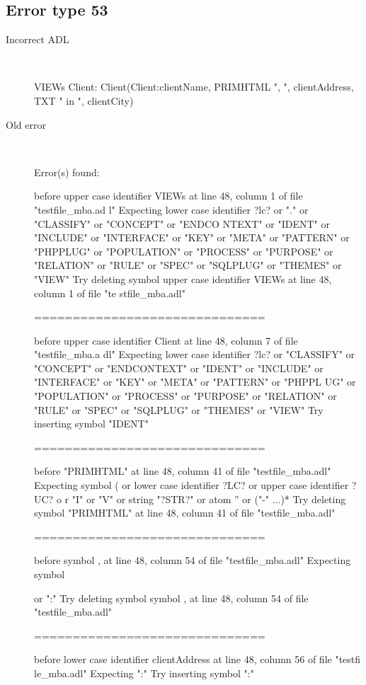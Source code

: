 \subsection{Error type 53}
  \begin{description}
  \item[Incorrect ADL]~\\
\begin{adl}
VIEWs Client: Client(Client:clientName, PRIMHTML ", ", clientAddress, TXT " in ", clientCity)\end{adl}
  \item[Old error]~\\
\begin{haskell}
Error(s) found:

before upper case identifier VIEWs at line 48, column 1 of file "testfile_mba.ad
l"
Expecting lower case identifier ?lc? or "." or "CLASSIFY" or "CONCEPT" or "ENDCO
NTEXT" or "IDENT" or "INCLUDE" or "INTERFACE" or "KEY" or "META" or "PATTERN" or
 "PHPPLUG" or "POPULATION" or "PROCESS" or "PURPOSE" or "RELATION" or "RULE" or
"SPEC" or "SQLPLUG" or "THEMES" or "VIEW"
Try deleting symbol upper case identifier VIEWs at line 48, column 1 of file "te
stfile_mba.adl"

==============================

before upper case identifier Client at line 48, column 7 of file "testfile_mba.a
dl"
Expecting lower case identifier ?lc? or "CLASSIFY" or "CONCEPT" or "ENDCONTEXT"
or "IDENT" or "INCLUDE" or "INTERFACE" or "KEY" or "META" or "PATTERN" or "PHPPL
UG" or "POPULATION" or "PROCESS" or "PURPOSE" or "RELATION" or "RULE" or "SPEC"
or "SQLPLUG" or "THEMES" or "VIEW"
Try inserting symbol "IDENT"

==============================

before "PRIMHTML" at line 48, column 41 of file "testfile_mba.adl"
Expecting symbol ( or lower case identifier ?LC? or upper case identifier ?UC? o
r "I" or "V" or string "?STR?" or atom '' or ("-" ...)*
Try deleting symbol "PRIMHTML" at line 48, column 41 of file "testfile_mba.adl"

==============================

before symbol , at line 48, column 54 of file "testfile_mba.adl"
Expecting symbol { or ":"
Try deleting symbol symbol , at line 48, column 54 of file "testfile_mba.adl"

==============================

before lower case identifier clientAddress at line 48, column 56 of file "testfi
le_mba.adl"
Expecting ":"
Try inserting symbol ":"

}
\end{haskell}
\end{description}
